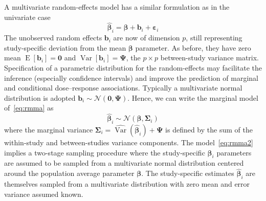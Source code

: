 \documentclass[11pt,a4paper,twoside,openany]{book}\usepackage{knitr}
\DeclareMathOperator{\Var}{Var}
\DeclareMathOperator{\E}{E}
\begin{document}
{A multivariate random-effects model has a similar formulation as in the univariate case
\begin{equation}
\boldsymbol{\hat \beta}_i = \boldsymbol{\beta} + \mathbf{b}_i + \boldsymbol{\varepsilon}_i
\label{eq:rmma}
\end{equation}
\noindent The unobserved random effects $\mathbf{b}_i$ are now of dimension $p$, still representing study-specific deviation from the mean $\boldsymbol{\beta}$ parameter. As before, they have zero mean $\E\left[\mathbf{b}_i\right] = \mathbf{0}$ and $\Var\left[\mathbf{b}_i\right] = \boldsymbol{\Psi}$, the $p \times p$ between-study variance matrix. Specification of a parametric distribution for the random-effects may facilitate the inference (especially confidence intervals) and improve the prediction of marginal and conditional dose--response associations. Typically a multivariate normal distribution is adopted $\mathbf{b}_i \sim \mathcal{N}\left(\mathbf{0}, \boldsymbol{\Psi} \right)$. Hence, we can write the marginal model of~\ref{eq:rmma} as
\begin{equation}
\boldsymbol{\hat \beta}_i \sim \mathcal{N}\left(\boldsymbol{\beta}, \boldsymbol{\Sigma}_i \right)
\label{eq:rmma2}
\end{equation}
\noindent where the marginal variance $\boldsymbol{\Sigma}_i = \widehat{\Var} \left( \boldsymbol{\hat \beta}_i \right) + \boldsymbol{\Psi}$ is defined by the sum of the within-study and between-studies variance components. The model~\ref{eq:rmma2} implies a two-stage sampling procedure where the study-specific $\boldsymbol{\beta}_i$ parameters are assumed to be sampled from a multivariate normal distribution centered around the population average parameter $\boldsymbol{\beta}$. The study-specific estimates $\boldsymbol{\hat \beta}_i$ are themselves sampled from a multivariate distribution with zero mean and error variance assumed known.

}
\end{document}
